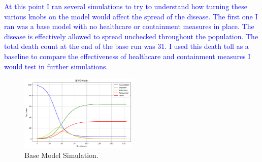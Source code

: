\documentclass[%
 reprint,
superscriptaddress,
 amsmath,amssymb,
 aps,
floatfix,
]{revtex4-2}
\begin{document}
\textcolor{blue}{
    At this point I ran several simulations to try to understand how turning these various knobs on the model would affect the spread of the disease.
    The first one I ran was a base model with no healthcare or containment measures in place.
    The disease is effectively allowed to spread unchecked throughout the population.
    The total death count at the end of the base run was 31.
    I used this death toll as a baseline to compare the effectiveness of healthcare and containment measures I would test in further simulations.}
\begin{figure}[hbt!]
    \centering
    \includegraphics[width=0.5\textwidth]{BaseModel.png}
    \caption{Base Model Simulation.}
    \label{Base Model}
\end{figure}
\end{document}
